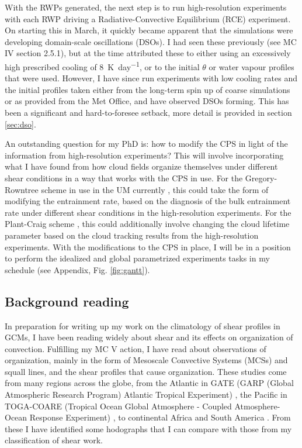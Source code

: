 \documentclass[11pt,a4paper]{article}
\begin{document}
With the RWPs generated, the next step is to run high-resolution experiments with each RWP driving a Radiative-Convective Equilibrium (RCE) experiment. On starting this in March, it quickly became apparent that the simulations were developing domain-scale oscillations (DSOs). I had seen these previously (see MC IV section 2.5.1), but at the time attributed these to either using an excessively high prescribed cooling of \SI{8}{K.day^{-1}}, or to the initial $\theta$ or water vapour profiles that were used. However, I have since run experiments with low cooling rates and the initial profiles taken either from the long-term spin up of coarse simulations or as provided from the Met Office, and have observed DSOs forming. This has been a significant and hard-to-foresee setback, more detail is provided in section \ref{sec:dso}.

An outstanding question for my PhD is: how to modify the CPS in light of the information from high-resolution experiments? This will involve incorporating what I have found from how cloud fields organize themselves under different shear conditions in a way that works with the CPS in use. For the Gregory-Rowntree scheme in use in the UM currently \parencite{gregory1990mass}, this could take the form of modifying the entrainment rate, based on the diagnosis of the bulk entrainment rate under different shear conditions in the high-resolution experiments. For the Plant-Craig scheme \parencite{plant2008stochastic}, this could additionally involve changing the cloud lifetime parameter based on the cloud tracking results from the high-resolution experiments. With the modifications to the CPS in place, I will be in a position to perform the idealized and global parametrized experiments tasks in my schedule (see Appendix, Fig. \ref{fig:gantt}).

\subsection{Background reading}
\label{sec:Background reading}

In preparation for writing up my work on the climatology of shear profiles in GCMs, I have been reading widely about shear and its effects on organization of convection. Fulfilling my MC V action, I have read about observations of organization, mainly in the form of Mesoscale Convective Systems (MCSs) and squall lines, and the shear profiles that cause organization. These studies come from many regions across the globe, from the Atlantic in GATE (GARP (Global Atmospheric Research Program) Atlantic Tropical Experiment) \parencite{houze1977structure, zipser1977mesoscale}, the Pacific in TOGA-COARE (Tropical Ocean Global Atmosphere - Coupled Atmosphere-Ocean Response Experiment) \parencite{jorgensen1997structure}, to continental Africa \parencite{peters1988structure} and South America \parencite{cohen1995environmental}. From these I have identified some hodographs that I can compare with those from my classification of shear work.
\end{document}
